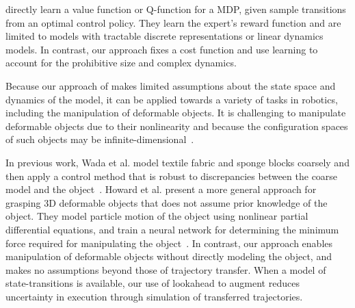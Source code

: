 \citet{Dvijotham_ICML2010} directly
learn a value function or Q-function for a MDP, given sample transitions
from an optimal control policy. They learn the expert's 
reward function and are limited to models with tractable discrete representations 
or linear dynamics models.
In contrast, our approach fixes a cost function 
and use learning to account for the prohibitive size and
complex dynamics.


 
Because our approach of \mmql{} makes limited assumptions about the state space
and dynamics of the model, it can be applied towards a variety of tasks
in robotics, including the manipulation of deformable objects.
It is challenging to manipulate deformable objects due to their nonlinearity
and because the configuration spaces of such objects may be
infinite-dimensional~\cite{Lamiraux_IJRR2001}.

In previous work, Wada et al. model textile fabric and sponge blocks
coarsely and then apply a control method that is robust
to discrepancies between the coarse model and the
object~\cite{Wada_ArticMotion2000}. Howard et al. present a more
general approach for grasping 3D deformable objects
that does not assume prior knowledge of the object.
They model particle motion of the object using nonlinear partial differential
equations, and train a neural network for determining the minimum force
required for manipulating the object~\cite{Howard_AutRobots2000}.
In contrast, our approach enables manipulation of deformable objects
without directly modeling the object, and makes no assumptions beyond
those of trajectory transfer. When a model of state-transitions
is available, our use of
lookahead to augment \mmql{} reduces uncertainty in execution through
simulation of transferred trajectories.

